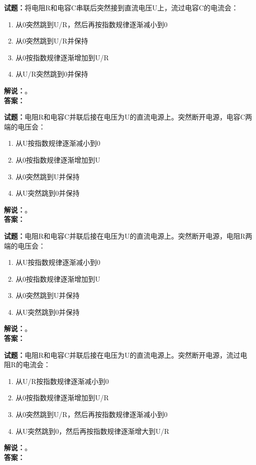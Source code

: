 \documentclass{ctexbook}
\begin{document}
\vspace{\baselineskip}

\noindent\textbf{试题：}将电阻R和电容C串联后突然接到直流电压U上，流过电容C的电流会：
\begin{enumerate}[leftmargin=3em]
  \item 从0突然跳到U/R，然后再按指数规律逐渐减小到0
  \item 从0突然跳到U/R并保持
  \item 从0按指数规律逐渐增加到U/R
  \item 从U/R突然跳到0并保持
\end{enumerate}
\noindent\textbf{解说：}\textbf{}。\\\noindent\textbf{答案：}

\vspace{\baselineskip}

\noindent\textbf{试题：}电阻R和电容C并联后接在电压为U的直流电源上。突然断开电源，电容C两端的电压会：
\begin{enumerate}[leftmargin=3em]
  \item 从U按指数规律逐渐减小到0
  \item 从0按指数规律逐渐增加到U
  \item 从0突然跳到U并保持
  \item 从U突然跳到0并保持
\end{enumerate}
\noindent\textbf{解说：}\textbf{}。\\\noindent\textbf{答案：}

\vspace{\baselineskip}

\noindent\textbf{试题：}电阻R和电容C并联后接在电压为U的直流电源上。突然断开电源，电阻R两端的电压会：
\begin{enumerate}[leftmargin=3em]
  \item 从U按指数规律逐渐减小到0
  \item 从0按指数规律逐渐增加到U
  \item 从0突然跳到U并保持
  \item 从U突然跳到0并保持
\end{enumerate}
\noindent\textbf{解说：}\textbf{}。\\\noindent\textbf{答案：}

\vspace{\baselineskip}

\noindent\textbf{试题：}电阻R和电容C并联后接在电压为U的直流电源上。突然断开电源，流过电阻R的电流会：
\begin{enumerate}[leftmargin=3em]
  \item 从U/R按指数规律逐渐减小到0
  \item 从0按指数规律逐渐增加到U/R
  \item 从0突然跳到U/R，然后再按指数规律逐渐减小到0
  \item 从U突然跳到0，然后再按指数规律逐渐增大到U/R
\end{enumerate}
\noindent\textbf{解说：}\textbf{}。\\\noindent\textbf{答案：}
\end{document}
